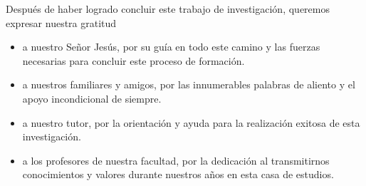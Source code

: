\begin{acknowledgements}
    Después de haber logrado concluir este trabajo de investigación,
    queremos expresar nuestra gratitud

    \begin{itemize}
        \item
        a nuestro Señor Jesús, por su guía en todo este camino y las fuerzas
        necesarias para concluir este proceso de formación.

        \item
        a nuestros familiares y amigos, por las innumerables palabras de
        aliento y el apoyo incondicional de siempre.

        \item
        a nuestro tutor, por la orientación y ayuda para la realización
        exitosa de esta investigación.

        \item
        a los profesores de nuestra facultad, por la dedicación al
        transmitirnos conocimientos y valores durante nuestros años
        en esta casa de estudios.
    \end{itemize}
\end{acknowledgements}
